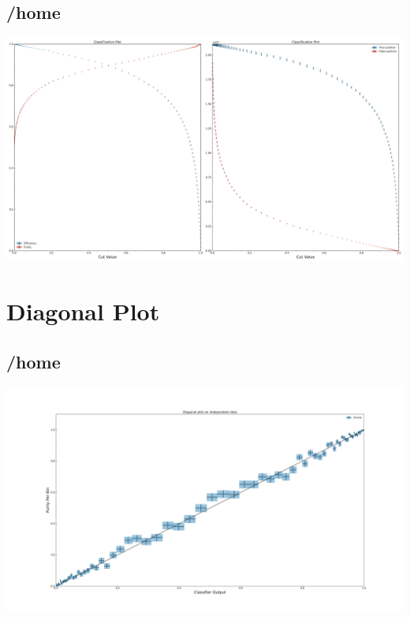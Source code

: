 \documentclass[10pt,a4paper]{article}
\begin{document}
\subsection{/home}
\begin{center}
\includegraphics[width=1\textwidth]{classification_result_-2246559386340646363.pdf}
\end{center}
\raggedbottom
\pagebreak[0]
\FloatBarrier
\section{Diagonal Plot}
\subsection{/home}
\begin{center}
\includegraphics[width=1.0\textwidth]{diagonal_plot_test.pdf}
\end{center}
\end{document}
